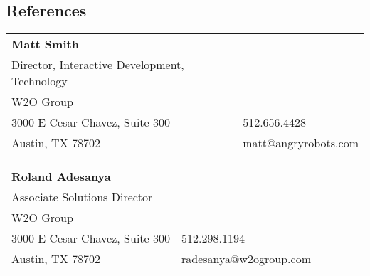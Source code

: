 \documentclass[margin,line]{resume}
\begin{document}
\begin{resume}

\vspace{1em}

\section{\mysidestyle References}

\begin{tabular}{@{}p{9cm}p{3cm}}
\textbf{Matt Smith}\\
Director, Interactive Development, Technology\\
W2O Group\\
3000 E Cesar Chavez, Suite 300                 &  512.656.4428\\
Austin, TX 78702                     &  matt@angryrobots.com\\
\end{tabular}

\begin{tabular}{@{}p{9cm}p{3cm}}
\textbf{Roland Adesanya}\\
Associate Solutions Director\\
W2O Group\\
3000 E Cesar Chavez, Suite 300                 &  512.298.1194\\
Austin, TX 78702                     &  radesanya@w2ogroup.com\\
\end{tabular}




\end{resume}
\end{document}
